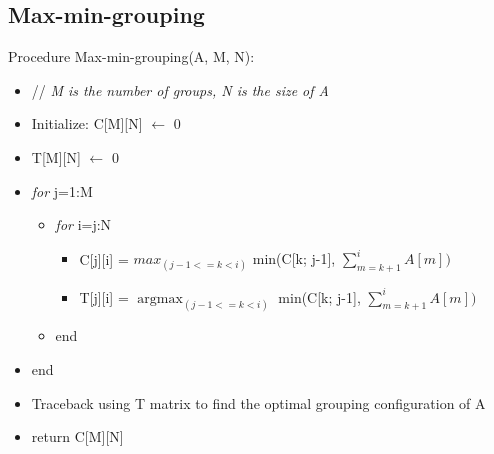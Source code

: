 \documentclass{article}
\DeclareMathOperator*{\argmax}{argmax}
\begin{document}
\subsection{Max-min-grouping}
\begin{spacing}{0.005}
Procedure Max-min-grouping(A, M, N):
\begin{itemize}[label={}]
\item // \textit{M is the number of groups, N is the size of A}
\item Initialize: C[M][N] $\leftarrow$ 0
\item \quad \quad \quad \quad \quad  T[M][N] $\leftarrow$ 0
\item \textit{for} j=1:M
  \begin{itemize} [label={}]
  \item \textit{for} i=j:N
    \begin{itemize} [label={}]
    \item C[j][i] = $max_{(j-1 <= k < i)}$ {min(C[k; j-1], $\sum_{m = k+1}^{i} A[m])$}
    \item T[j][i] = $\argmax_{(j-1 <= k < i)}$ {min(C[k; j-1], $\sum_{m = k+1}^{i} A[m])$}
    \end{itemize}
  \item end
  \end{itemize}
\item end
\item Traceback using T matrix to find the optimal grouping configuration of A
\item return C[M][N]
\end{itemize}


\end{spacing}
\end{document}
